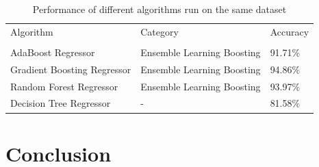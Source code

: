 \documentclass[journal,twoside,web]{ieeecolor}
\begin{document}
\begin{table}[h]
    \caption{Performance of different algorithms run on the same dataset}
    \label{tab:summary}
	\centering
    \begin{tabular}{l l l}
    \toprule
    \multirow{1}{*}{Algorithm} & \multirow{1}{*}{Category} & \multirow{1}{*}{Accuracy} \\ 
    && \\ \midrule
    AdaBoost Regressor & Ensemble Learning Boosting & 91.71\% \\ \midrule
    Gradient Boosting Regressor & Ensemble Learning Boosting & 94.86\% \\ \midrule
    Random Forest Regressor & Ensemble Learning Boosting & 93.97\% \\ \midrule
    Decision Tree Regressor & - & 81.58\% \\
    \bottomrule
    \end{tabular}
\end{table}

\section{Conclusion}
\label{sec:conclusion}



\end{document}
